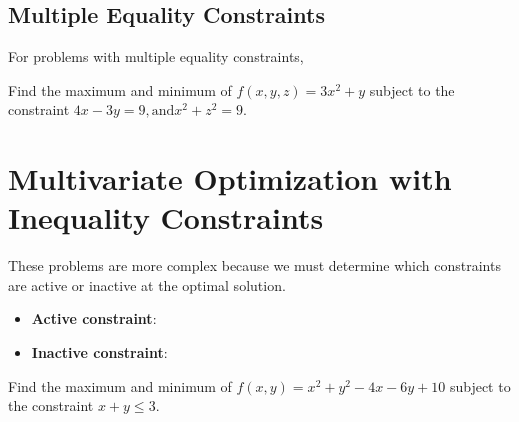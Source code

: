 \documentclass[11pt,a4paper]{article}
\theoremstyle{definition}
\begin{document}
\subsection*{Multiple Equality Constraints}

For problems with multiple equality constraints,

\begin{defbox}
\vspace{30mm}
\end{defbox}

\begin{examplebox}
Find the maximum and minimum of $ f(x,y,z) = 3x^2 + y $ subject to the constraint $4x-3y=9, \text{and} x^2+z^2=9 $.
\vspace{50mm}
\end{examplebox}


\section*{Multivariate Optimization with Inequality Constraints}

These problems are more complex because we must determine which constraints are active or inactive at the optimal solution.

\begin{defbox}
\vspace{40mm}
\end{defbox}

\begin{defbox}

\vspace{90mm}
\end{defbox}

\begin{defbox}
\begin{itemize}
    \item \textbf{Active constraint}: 
    \vspace{10mm}
    \item \textbf{Inactive constraint}: 
    \vspace{10mm}
\end{itemize}
\end{defbox}

\begin{examplebox}
Find the maximum and minimum of $ f(x,y) = x^2 + y^2 - 4x -6y + 10 $ subject to the constraint $x+y\leq 3 $.
\vspace{50mm}
\end{examplebox}
\end{document}

